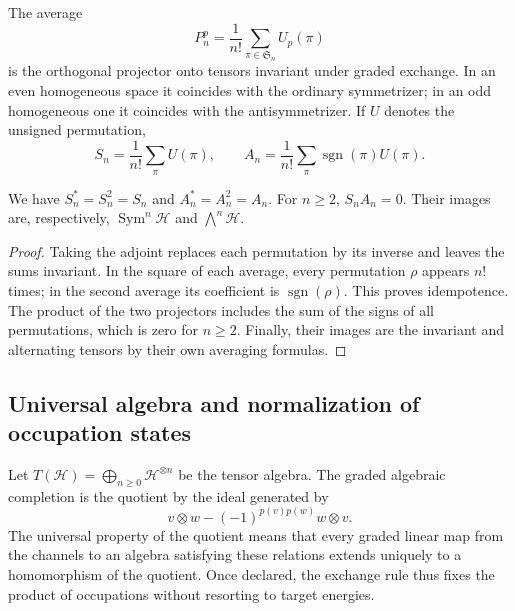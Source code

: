 The average
\[
 P_n^p=\frac1{n!}\sum_{\pi\in\mathfrak S_n}U_p(\pi)
\]
is the orthogonal projector onto tensors invariant under graded
exchange. In an even homogeneous space it coincides with the
ordinary symmetrizer; in an odd homogeneous one it coincides with the
antisymmetrizer. If \(U\) denotes the unsigned permutation,
\begin{equation}
 S_n=\frac1{n!}\sum_\pi U(\pi),\qquad
 A_n=\frac1{n!}\sum_\pi\operatorname{sgn}(\pi)U(\pi).
 \label{vi:vi:eq:simetrizadores-fock}
\end{equation}

\begin{proposition}
\label{vi:vi:prop:proyectores-fock}
We have \(S_n^*=S_n^2=S_n\) and \(A_n^*=A_n^2=A_n\).
For \(n\ge2\), \(S_nA_n=0\). Their images are, respectively,
\(\operatorname{Sym}^n\mathcal H\) and \(\bigwedge^n\mathcal H\).
\end{proposition}
\begin{proof}
Taking the adjoint replaces each permutation by its inverse and leaves
the sums invariant. In the square of each average, every
permutation \(\rho\) appears \(n!\) times; in the second average
its coefficient is \(\operatorname{sgn}(\rho)\). This proves
idempotence. The product of the two projectors includes the sum
of the signs of all permutations, which is zero for
\(n\ge2\). Finally, their images are the invariant
and alternating tensors by their own averaging formulas.
\end{proof}

\subsection{Universal algebra and normalization of occupation states}
\label{vi:vi:subsec:fock-construccion}

Let \(T(\mathcal H)=\bigoplus_{n\ge0}\mathcal H^{\otimes n}\)
be the tensor algebra. The graded algebraic completion is the
quotient by the ideal generated by
\begin{equation}
 v\otimes w-(-1)^{p(v)p(w)}w\otimes v.
 \label{vi:vi:eq:ideal-fock}
\end{equation}
The universal property of the quotient means that every graded
linear map from the channels to an algebra satisfying these
relations extends uniquely to a homomorphism of the
quotient. Once declared, the exchange rule thus fixes the
product of occupations without resorting to target energies.

